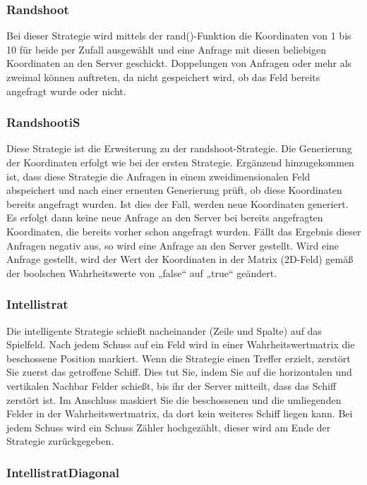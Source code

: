 \subsubsection*{Randshoot}

Bei dieser Strategie wird mittels der rand()-Funktion die Koordinaten von 1 bis 10 für
beide per Zufall ausgewählt und eine Anfrage mit diesen beliebigen Koordinaten an den
Server geschickt. Doppelungen von Anfragen oder mehr als zweimal können auftreten,
da nicht gespeichert wird, ob das Feld bereits angefragt wurde oder nicht.

\subsubsection*{RandshootiS}

Diese Strategie ist die Erweiterung zu der randshoot-Strategie. Die Generierung der
Koordinaten erfolgt wie bei der ersten Strategie. Ergänzend hinzugekommen ist, dass
diese Strategie die Anfragen in einem zweidimensionalen Feld abspeichert und nach
einer erneuten Generierung prüft, ob diese Koordinaten bereits angefragt wurden. Ist
dies der Fall, werden neue Koordinaten generiert. Es erfolgt dann keine neue Anfrage an
den Server bei bereits angefragten Koordinaten, die bereits vorher schon angefragt
wurden. Fällt das Ergebnis dieser Anfragen negativ aus, so wird eine Anfrage an den
Server gestellt. Wird eine Anfrage gestellt, wird der Wert der Koordinaten in der Matrix
(2D-Feld) gemäß der boolschen Wahrheitswerte von „false“ auf „true“ geändert.

\subsubsection*{Intellistrat}

Die intelligente Strategie schießt nacheinander (Zeile und Spalte) auf das Spielfeld. Nach jedem Schuss auf ein Feld wird in einer Wahrheitswertmatrix die beschossene Position markiert. Wenn die Strategie einen Treffer erzielt, zerstört Sie zuerst das getroffene Schiff. Dies tut Sie, indem Sie auf die horizontalen und vertikalen Nachbar Felder schießt, bis ihr der Server mitteilt, dass das Schiff zerstört ist. Im Anschluss maskiert Sie die beschossenen und die umliegenden Felder in der Wahrheitswertmatrix, da dort kein weiteres Schiff liegen kann. Bei jedem Schuss wird ein Schuss Zähler hochgezählt, dieser wird am Ende der Strategie zurückgegeben.

\subsubsection*{IntellistratDiagonal}


